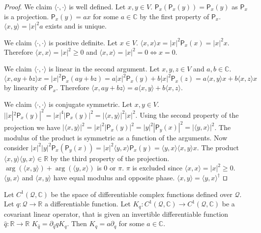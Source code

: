 \documentclass[smallextended]{svjour3}
\numberwithin{equation}{section}
\renewenvironment{proof}{\emph{Proof}.}{\hfill\(\qed\)}
\begin{document}
\begin{proof}
	We claim $\langle \cdot , \cdot \rangle$ is well defined. Let $x, y \in V$. $\mathsf{P}_x (\mathsf{P}_x (y)) =\mathsf{P}_x(y)$ as $\mathsf{P}_x$ is a projection. $\mathsf{P}_x(y) = a x $ for some $a \in \mathbb{C}$ by the first property of $\mathsf{P}_x$. $\langle x , y \rangle = |x|^2 a$ exists and is unique. 
	
	We claim $\langle \cdot , \cdot \rangle$ is positive definite. Let $x \in V$. $\langle x , x \rangle x = |x|^2 \mathsf{P}_x(x) = |x|^2 x $. Therefore $\langle x , x \rangle = |x|^2 \ge 0$ and $\langle x , x \rangle = |x|^2 = 0 \Leftrightarrow x = 0$.
	
	We claim $\langle \cdot , \cdot \rangle$ is linear in the second argument. Let $x,y,z \in V$ and $a,b \in \mathbb{C}$. $\langle x , a y + b z \rangle x = |x|^2 \mathsf{P}_x(a y + b z)=a  |x|^2 \mathsf{P}_x(y) + b  |x|^2 \mathsf{P}_x(z) = a \langle x , y \rangle x + b \langle x, z \rangle x$ by linearity of $\mathsf{P}_x$. Therefore $\langle x , a y + b z \rangle = a \langle x , y \rangle + b \langle x, z \rangle$.
	
	We claim $\langle \cdot , \cdot \rangle$ is conjugate symmetric. Let $x,y \in V$. $ | |x|^2\mathsf{P}_x(y)|^2 = |x|^4|\mathsf{P}_x(y)|^2 = |\langle x , y \rangle|^2 |x|^2$. Using the second property of the projection we have $|\langle x , y \rangle|^2 = |x|^2|\mathsf{P}_x(y)|^2 =  |y|^2|\mathsf{P}_y(x)|^2 = |\langle y , x \rangle|^2$. The modulus of the product is symmetric as a function of the arguments. Now consider $|x|^2|y|^2\mathsf{P}_x(\mathsf{P}_y(x)) = |x|^2 \langle y , x \rangle \mathsf{P}_x(y) = \langle y , x \rangle \langle x , y \rangle x$. The product $\langle x , y \rangle \langle y , x \rangle \in \mathbb{R}$ by the third property of the projection. $\arg(\langle x , y \rangle) + \arg(\langle y , x \rangle)$ is $0$ or $\pi$. $\pi$ is excluded since $\langle x , x \rangle = |x|^2 \ge 0$. $\langle y , x \rangle$ and $\langle x , y \rangle$ have equal modulus and opposite phase. $\langle x , y \rangle = \langle y , x \rangle^\dagger$
\end{proof}

\begin{thrm}\label{thrm:covariant_operator}
	Let $C^1(\mathcal{Q}, \mathbb{C})$ be the space of differentiable complex functions defined over $\mathcal{Q}$. Let $q : \mathcal{Q} \rightarrow \mathbb{R}$ a differentiable function. Let $K_q : C^1(\mathcal{Q}, \mathbb{C}) \rightarrow C^1(\mathcal{Q}, \mathbb{C})$ be a covariant linear operator, that is given an invertible differentiable function $\hat{q} : \mathbb{R} \rightarrow \mathbb{R}$ $K_{\hat{q}} = \partial_{\hat{q}} q K_{q}$. Then $K_q = a \partial_q$ for some $a \in \mathbb{C}$.
\end{thrm}
\end{document}
